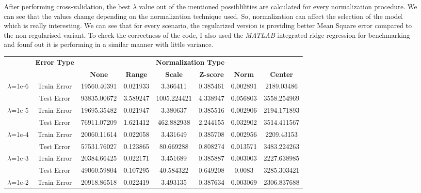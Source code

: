 \documentclass[11pt]{article}
\begin{document}
After performing cross-validation,  the best $\lambda$ value out of the mentioned possiblilities are calculated for every normalization procedure. We can see that the values change depending on the normalization technique used. So, normalization can affect the selection of the model which is really interesting. We can see that for every scenario, the regularized version is providing better Mean Square error compared to the non-regularised variant. To check the correctness of the code, I also used the \textit{MATLAB} integrated ridge regression for benchmarking and founf out it is performing in a similar manner with little variance. 

\begin{table}[H]
	\centering
	\label{Tab:Results}
	\begin{adjustbox}{width=0.75\paperwidth}
		\begin{tabular}{| c | c |cccccc|}
			\hline
			\centering
			& \multirow{2}{*}{\textbf{Error Type}} & \multicolumn{6}{|c|}{\textbf{Normalization Type}}\\ \cline{3-8}
			&  & \textbf{None} & \textbf{Range} & \textbf{Scale} & \textbf{Z-score} & \textbf{Norm} & \textbf{Center} \\ \hline
			\multirow{2}{*}{$\lambda$=1e-6} & Train Error & 19560.40391 & 0.021933 & 3.366411 & 0.385461 & 0.002891 & 2189.03486 \\ 
			& Test Error & 93835.00672 & 3.589247 & 1005.224421 & 4.338947 & 0.056803 & 3558.254969 \\ \hline
			\multirow{2}{*}{$\lambda$=1e-5} & Train Error & 19695.35482 & 0.021947 & 3.380637 & 0.385516 & 0.002906 & 2194.171893 \\ 
			& Test Error & 76911.07209 & 1.621412 & 462.882938 & 2.244155 & 0.032902 & 3514.411567 \\ \hline
			\multirow{2}{*}{$\lambda$=1e-4} & Train Error & 20060.11614 & 0.022058 & 3.431649 & 0.385708 & 0.002956 & 2209.43153 \\ 
			& Test Error & 57531.76027 & 0.123865 & 80.669288 & 0.808274 & 0.013571 & 3483.224263 \\ \hline
			\multirow{2}{*}{$\lambda$=1e-3} & Train Error & 20384.66425 & 0.022171 & 3.451689 & 0.385887 & 0.003003 & 2227.638985 \\ 
			& Test Error & 49060.59804 & 0.107295 & 40.584322 & 0.649208 & 0.0083 & 3285.303421 \\ \hline
			\multirow{2}{*}{$\lambda$=1e-2} & Train Error & 20918.86518 & 0.022419 & 3.493135 & 0.387634 & 0.003069 & 2306.837688 \\ 

\end{tabular}
\end{adjustbox}
\end{table}
\end{document}
